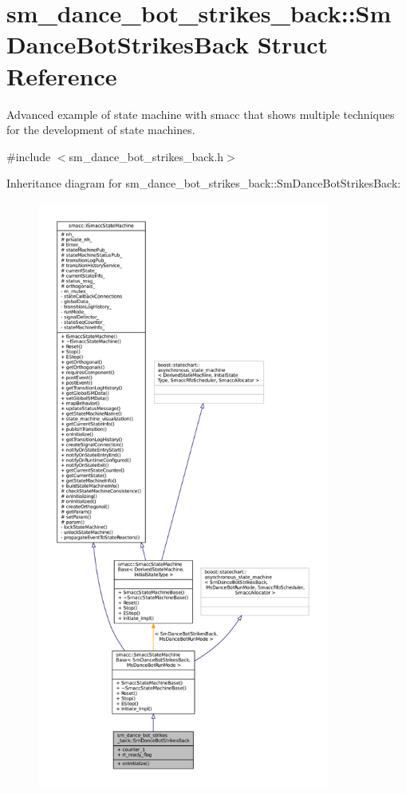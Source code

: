 \hypertarget{structsm__dance__bot__strikes__back_1_1SmDanceBotStrikesBack}{}\section{sm\+\_\+dance\+\_\+bot\+\_\+strikes\+\_\+back\+:\+:Sm\+Dance\+Bot\+Strikes\+Back Struct Reference}
\label{structsm__dance__bot__strikes__back_1_1SmDanceBotStrikesBack}


Advanced example of state machine with smacc that shows multiple techniques for the development of state machines.  




{\ttfamily \#include $<$sm\+\_\+dance\+\_\+bot\+\_\+strikes\+\_\+back.\+h$>$}



Inheritance diagram for sm\+\_\+dance\+\_\+bot\+\_\+strikes\+\_\+back\+:\+:Sm\+Dance\+Bot\+Strikes\+Back\+:
\nopagebreak
\begin{figure}[H]
\begin{center}
\leavevmode
\includegraphics[height=550pt]{structsm__dance__bot__strikes__back_1_1SmDanceBotStrikesBack__inherit__graph}
\end{center}
\end{figure}


